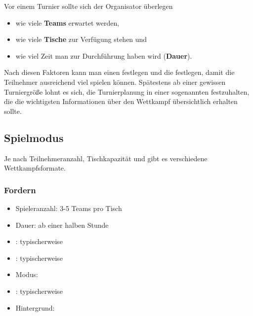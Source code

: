 Vor einem Turnier sollte sich der Organisator überlegen
\begin{itemize}
\item wie viele {\bf Teams} erwartet werden, 
\item wie viele {\bf Tische} zur Verfügung stehen und
\item wie viel Zeit man zur Durchführung haben wird ({\bf Dauer}).
\end{itemize}
Nach diesen Faktoren kann man einen  festlegen und die  festlegen, damit die Teilnehmer ausreichend viel spielen können. 
Spätestens ab einer gewissen Turniergröße lohnt es sich, die Turnierplanung in einer sogenannten  festzuhalten, die die wichtigsten Informationen über den Wettkampf übersichtlich erhalten sollte.

\subsection{Spielmodus}
\label{turniere:vorbereitung:modus}

Je nach Teilnehmeranzahl, Tischkapazität und
gibt es verschiedene Wettkampfsformate.



\subsubsection{Fordern}
\label{turniere:vorbereitung:modus:fordern}

\begin{itemize}
\item Spieleranzahl: 3-5 Teams pro Tisch
\item Dauer: ab einer halben Stunde
\item {}: typischerweise  
\item {}: typischerweise 
\item Modus: 
\item {}:
typischerweise  
\item Hintergrund:
\end{itemize}


